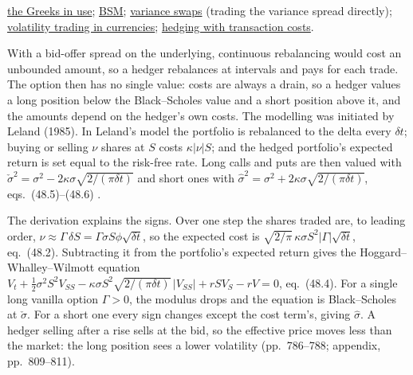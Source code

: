 \begin{qfresult}
 \hyperref[meth:greeks-delta-gamma-hedging]{the Greeks in use}; \hyperref[mod:black-scholes-merton]{BSM}; \hyperref[def:vix-variance-dividend-swaps]{variance swaps} (trading the variance spread directly); \hyperref[meth:active-currency-strategies]{volatility trading in currencies}; \hyperref[meth:transaction-cost-hedging]{hedging with transaction costs}.

\end{qfresult}

\begin{qfmethod}\label{meth:transaction-cost-hedging}
 With a bid-offer spread on the underlying, continuous rebalancing would cost an unbounded amount, so a hedger rebalances at intervals and pays for each trade. The option then has no single value: costs are always a drain, so a hedger values a long position below the Black--Scholes value and a short position above it, and the amounts depend on the hedger's own costs. The modelling was initiated by Leland (1985). In Leland's model the portfolio is rebalanced to the delta every $\delta t$; buying or selling $\nu$ shares at $S$ costs $\kappa|\nu|S$; and the hedged portfolio's expected return is set equal to the risk-free rate. Long calls and puts are then valued with $\check\sigma^2=\sigma^2-2\kappa\sigma\sqrt{2/(\pi\delta t)}$ and short ones with $\hat\sigma^2=\sigma^2+2\kappa\sigma\sqrt{2/(\pi\delta t)}$, eqs.~(48.5)--(48.6) \citep[chap.~48, secs.~48.1--48.4, pp.~783--789]{wide-wilmott-pwoqf}.

The derivation explains the signs. Over one step the shares traded are, to leading order, $\nu\approx\Gamma\,\delta S=\Gamma\sigma S\phi\sqrt{\delta t}$, so the expected cost is $\sqrt{2/\pi}\,\kappa\sigma S^2|\Gamma|\sqrt{\delta t}$, eq.~(48.2). Subtracting it from the portfolio's expected return gives the Hoggard--Whalley--Wilmott equation $V_t+\tfrac12\sigma^2S^2V_{SS}-\kappa\sigma S^2\sqrt{2/(\pi\delta t)}\,|V_{SS}|+rSV_S-rV=0$, eq.~(48.4). For a single long vanilla option $\Gamma>0$, the modulus drops and the equation is Black--Scholes at $\check\sigma$. For a short one every sign changes except the cost term's, giving $\hat\sigma$. A hedger selling after a rise sells at the bid, so the effective price moves less than the market: the long position sees a lower volatility (pp.~786--788; appendix, pp.~809--811).


\end{qfmethod}
